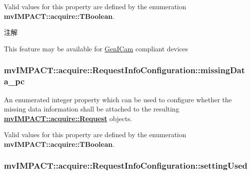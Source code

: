 Valid values for this property are defined by the enumeration {\bfseries mv\+I\+M\+P\+A\+C\+T\+::acquire\+::\+T\+Boolean}. \begin{DoxyNote}{注解}

\begin{DoxyItemize}
\item This feature may be available for \hyperlink{namespacemv_i_m_p_a_c_t_1_1acquire_1_1_gen_i_cam}{Gen\+I\+Cam} compliant devices 
\end{DoxyItemize}
\end{DoxyNote}
\hypertarget{classmv_i_m_p_a_c_t_1_1acquire_1_1_request_info_configuration_afde6ca0fa4de8ea8b77f70a1056c4549}{
\subsubsection[{missing\+Data\+\_\+pc}]{ mv\+I\+M\+P\+A\+C\+T\+::acquire\+::\+Request\+Info\+Configuration\+::missing\+Data\+\_\+pc}}\label{classmv_i_m_p_a_c_t_1_1acquire_1_1_request_info_configuration_afde6ca0fa4de8ea8b77f70a1056c4549}


An enumerated integer property which can be used to configure whether the missing data information shall be attached to the resulting {\bfseries \hyperlink{classmv_i_m_p_a_c_t_1_1acquire_1_1_request}{mv\+I\+M\+P\+A\+C\+T\+::acquire\+::\+Request}} objects. 

Valid values for this property are defined by the enumeration {\bfseries mv\+I\+M\+P\+A\+C\+T\+::acquire\+::\+T\+Boolean}. \hypertarget{classmv_i_m_p_a_c_t_1_1acquire_1_1_request_info_configuration_a88dae33b051b11e4c1b9c51f1cb9b05b}{
\subsubsection[{setting\+Used}]{ mv\+I\+M\+P\+A\+C\+T\+::acquire\+::\+Request\+Info\+Configuration\+::setting\+Used}}\label{classmv_i_m_p_a_c_t_1_1acquire_1_1_request_info_configuration_a88dae33b051b11e4c1b9c51f1cb9b05b}


